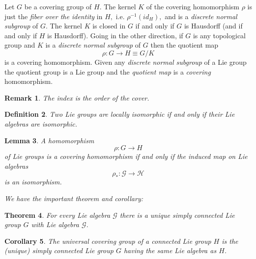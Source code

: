 \documentclass[aps,preprint]{revtex4}%
\newtheorem{theorem}{Theorem}
\newtheorem{corollary}[theorem]{Corollary}
\newtheorem{definition}[theorem]{Definition}
\newtheorem{lemma}[theorem]{Lemma}
\newtheorem{remark}[theorem]{Remark}
\begin{document}
Let $G$ be a covering group of $H$. The kernel $K$ of the covering
homomorphism $\rho$ is just the \emph{fiber over the identity} in $H,$ i.e.
$\rho^{-1}\left(  id_{H}\right)  ,$ and is a \emph{discrete normal subgroup}
of $G$. The kernel $K$ is closed in $G$ if and only if $G$ is Hausdorff (and
if and only if $H$ is Hausdorff). Going in the other direction, if $G$ is any
topological group and $K$ is a \emph{discrete normal subgroup} of $G$ then the
quotient map
\begin{equation}
\rho:G\rightarrow H\equiv G/K
\end{equation}
is a covering homomorphism. Given any \emph{discrete} \emph{normal subgroup}
of a Lie group the quotient group is a Lie group and the \emph{quotient map}
is a \emph{covering} homomorphism.

\begin{remark}
The index is the order of the cover.
\end{remark}

\begin{definition}
Two \emph{Lie groups} are \emph{locally isomorphic} if and only if their Lie
algebras are isomorphic.
\end{definition}

\begin{lemma}
A homomorphism
\begin{equation}
\rho:G\rightarrow H
\end{equation}
of Lie groups is a covering homomorphism if and only if the induced map on Lie
algebras%
\begin{equation}
\rho_{\ast}:\mathcal{G}\rightarrow\mathcal{H}%
\end{equation}
is an isomorphism.
\end{lemma}

\emph{We have the important theorem and corollary:}

\begin{theorem}
For every Lie algebra $\mathcal{G}$ there is a unique simply connected Lie
group $G$ with Lie algebra $\mathcal{G}$.
\end{theorem}

\begin{corollary}
The \emph{universal covering group} of a \emph{connected Lie group} $H$ is the
(unique) \emph{simply connected} Lie group $G$ having the same Lie algebra as
$H$.
\end{corollary}
\end{document}
